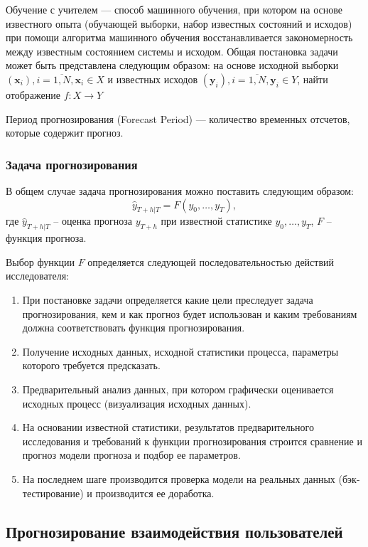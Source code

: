 Обучение с учителем --- способ машинного обучения, при котором на основе известного опыта (обучающей выборки, набор
известных состояний и исходов) при помощи алгоритма машинного обучения восстанавливается закономерность между известным
состоянием системы и исходом. Общая постановка задачи может быть представлена следующим образом: на основе исходной
выборки $\left( \mathbf{x}_i \right), i = \overline{1, N}, \mathbf{x}_i \in X$ и известных исходов
$\left( \mathbf{y}_i \right), i = \overline{1, N}, \mathbf{y}_i \in Y$, найти отображение $f: X \rightarrow Y$

Период прогнозирования (Forecast Period) --- количество временных отсчетов, которые содержит прогноз.

\subsubsection{Задача прогнозирования}
В общем случае задача прогнозирования можно поставить следующим образом:
\begin{equation}
    \hat{y}_{\left.T+h\right|T} = F\left(y_0, \dots, y_T\right),
\end{equation}
где  $\hat{y}_{\left.T+h\right|T}$ -- оценка прогноза $y_{T+h}$ при известной статистике $y_0, \dots, y_T$,
$F$ -- функция прогноза.

Выбор функции $F$ определяется следующей последовательностью действий исследователя:
\begin{enumerate}
    \item При постановке задачи определяется какие цели преследует задача прогнозирования, кем и как прогноз будет 
    использован и каким требованиям должна соответствовать функция прогнозирования.
    \item Получение исходных данных, исходной статистики процесса, параметры которого требуется предсказать.
    \item Предварительный анализ данных, при котором графически оценивается исходных процесс (визуализация исходных 
    данных).
    \item На основании известной статистики, результатов предварительного исследования и требований к функции
    прогнозирования строится сравнение и прогноз модели прогноза и подбор ее параметров.
    \item На последнем шаге производится проверка модели на реальных данных (бэк-тестирование) и производится ее
    доработка.
\end{enumerate}

\subsection{Прогнозирование взаимодействия пользователей}

